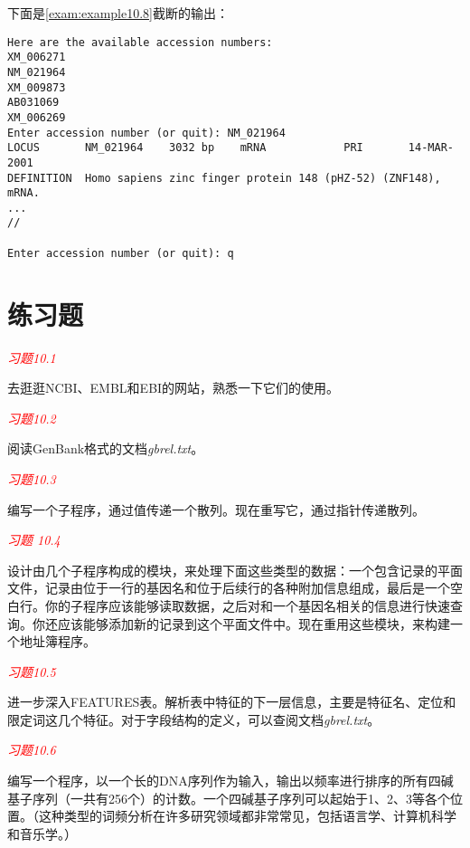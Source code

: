 

下面是\autoref{exam:example10.8}截断的输出：

\begin{lstlisting}
Here are the available accession numbers:
XM_006271
NM_021964
XM_009873
AB031069
XM_006269
Enter accession number (or quit): NM_021964
LOCUS       NM_021964    3032 bp    mRNA            PRI       14-MAR-2001
DEFINITION  Homo sapiens zinc finger protein 148 (pHZ-52) (ZNF148), mRNA.
...
//

Enter accession number (or quit): q
\end{lstlisting}

\section{练习题}
\textcolor{red}{\textit{习题10.1}}
\begin{adjustwidth}{4em}{}
去逛逛NCBI、EMBL和EBI的网站，熟悉一下它们的使用。
\end{adjustwidth}

\textcolor{red}{\textit{习题10.2}}
\begin{adjustwidth}{4em}{}
阅读GenBank格式的文档\textit{gbrel.txt}。
\end{adjustwidth}

\textcolor{red}{\textit{习题10.3}}
\begin{adjustwidth}{4em}{}
编写一个子程序，通过值传递一个散列。现在重写它，通过指针传递散列。
\end{adjustwidth}

\textcolor{red}{\textit{习题 10.4}}
\begin{adjustwidth}{4em}{}
设计由几个子程序构成的模块，来处理下面这些类型的数据：一个包含记录的平面文件，记录由位于一行的基因名和位于后续行的各种附加信息组成，最后是一个空白行。你的子程序应该能够读取数据，之后对和一个基因名相关的信息进行快速查询。你还应该能够添加新的记录到这个平面文件中。现在重用这些模块，来构建一个地址簿程序。
\end{adjustwidth}

\textcolor{red}{\textit{习题10.5}}
\begin{adjustwidth}{4em}{}
进一步深入FEATURES表。解析表中特征的下一层信息，主要是特征名、定位和限定词这几个特征。对于字段结构的定义，可以查阅文档\textit{gbrel.txt}。
\end{adjustwidth}

\textcolor{red}{\textit{习题10.6}}
\begin{adjustwidth}{4em}{}
编写一个程序，以一个长的DNA序列作为输入，输出以频率进行排序的所有四碱基子序列（一共有256个）的计数。一个四碱基子序列可以起始于1、2、3等各个位置。（这种类型的词频分析在许多研究领域都非常常见，包括语言学、计算机科学和音乐学。）
\end{adjustwidth}

